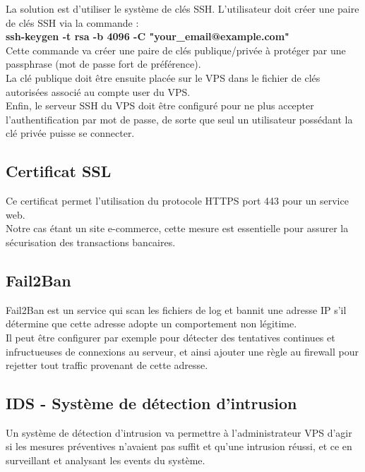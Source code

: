 \documentclass[a4paper,10pt,final,fleqn]{article}
\begin{document}
				La solution est d'utiliser le système de clés SSH. L'utilisateur doit créer une paire de clés SSH via la commande : \\

				\textbf{ssh-keygen -t rsa -b 4096 -C "your\_email@example.com"}\\

				Cette commande va créer une paire de clés publique/privée à protéger par une passphrase (mot de passe fort de préférence).\\
				La clé publique doit être ensuite placée sur le VPS dans le fichier de clés autorisées associé au compte user du VPS.\\

				Enfin, le serveur SSH du VPS doit être configuré pour ne plus accepter l'authentification par mot de passe, de sorte que seul un utilisateur possédant la clé privée puisse se connecter.\\

		\subsection{Certificat SSL}

			Ce certificat permet l'utilisation du protocole HTTPS port 443 pour un service web.\\
			Notre cas étant un site e-commerce, cette mesure est essentielle pour assurer la sécurisation des transactions bancaires.\\

		\subsection{Fail2Ban}

			Fail2Ban est un service qui scan les fichiers de log et bannit une adresse IP s'il détermine que cette adresse adopte un comportement non légitime.\\

			Il peut être configurer par exemple pour détecter des tentatives continues et infructueuses de connexions au serveur, et ainsi ajouter une règle au firewall pour rejetter tout traffic provenant de cette adresse.

		\subsection{IDS - Système de détection d'intrusion}

			Un système de détection d'intrusion va permettre à l'administrateur VPS d'agir si les mesures préventives n'avaient pas suffit et qu'une intrusion réussi, et ce en surveillant et analysant les events du système.\\
\end{document}
